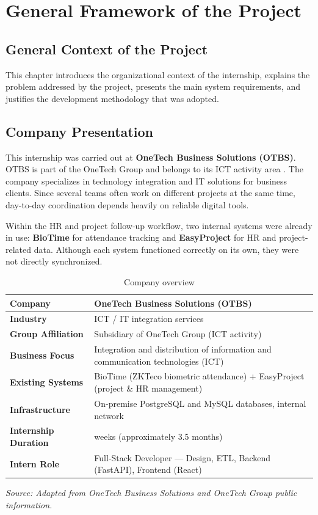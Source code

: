\chapter{General Framework of the Project}
\minitoc
\clearpage
\section{General Context of the Project}
This chapter introduces the organizational context of the internship, explains the problem addressed by the project, presents the main system requirements, and justifies the development methodology that was adopted.

\section{Company Presentation}
This internship was carried out at \textbf{OneTech Business Solutions (OTBS)}. OTBS is part of the OneTech Group and belongs to its ICT activity area \cite{otbs-website,otbs-linkedin}. The company specializes in technology integration and IT solutions for business clients. Since several teams often work on different projects at the same time, day-to-day coordination depends heavily on reliable digital tools.

Within the HR and project follow-up workflow, two internal systems were already in use: \textbf{BioTime} for attendance tracking and \textbf{EasyProject} for HR and project-related data. Although each system functioned correctly on its own, they were not directly synchronized.

\begin{table}[H]
	\centering
	\renewcommand{\arraystretch}{1.2}
	\begin{tabular}{|l|>{\raggedright\arraybackslash}p{10cm}|}
		\hline
		\textbf{Company} & OneTech Business Solutions (OTBS) \\
		\hline
		\textbf{Industry} & ICT / IT integration services \\
		\hline
		\textbf{Group Affiliation} & Subsidiary of OneTech Group (ICT activity) \\
		\hline
		\textbf{Business Focus} & Integration and distribution of information and communication technologies (ICT) \\
		\hline
		\textbf{Existing Systems} & BioTime (ZKTeco biometric attendance) + EasyProject (project \& HR management) \\
		\hline
		\textbf{Infrastructure} & On-premise PostgreSQL and MySQL databases, internal network \\
		\hline
		\textbf{Internship Duration} & 14 weeks (approximately 3.5 months) \\
		\hline
		\textbf{Intern Role} & Full-Stack Developer --- Design, ETL, Backend (FastAPI), Frontend (React) \\
		\hline
	\end{tabular}
	\caption{Company overview}
	\label{tab:company-overview}
	{\footnotesize\textit{Source: Adapted from OneTech Business Solutions and OneTech Group public information.}}
\end{table}

